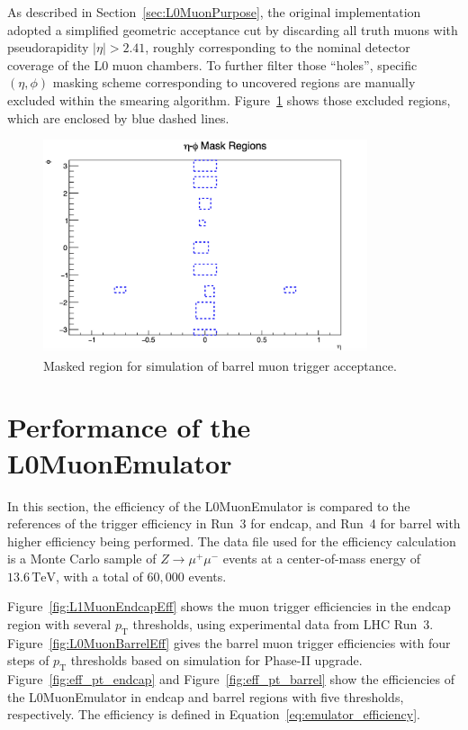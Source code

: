 As described in Section~\ref{sec:L0MuonPurpose}, the original implementation adopted a simplified geometric acceptance cut by discarding all truth muons with pseudorapidity $|\eta| > 2.41$, roughly corresponding to the nominal detector coverage of the L0 muon chambers. To further filter those ``holes'', specific $(\eta, \phi)$ masking scheme corresponding to uncovered regions are manually excluded within the smearing algorithm. Figure~\ref{fig:masking} shows those excluded regions, which are enclosed by blue dashed lines.

\begin{figure}[htbp]
  \centering
  \includegraphics[width=0.85\textwidth]{figs/chapter4/masked_eta_phi_map.png}
  \caption{Masked region for simulation of barrel muon trigger acceptance.}
  \label{fig:masking}
\end{figure}

\section{Performance of the L0MuonEmulator} \label{sec:L0MuonEmulatorPerformance}
In this section, the efficiency of the L0MuonEmulator is compared to the references of the trigger efficiency in Run~3 for endcap, and Run~4 for barrel with higher efficiency being performed. The data file used for the efficiency calculation is a Monte Carlo sample of $Z \to \mu^+ \mu^-$ events at a center-of-mass energy of $13.6\,\mathrm{TeV}$, with a total of $60{,}000$ events.

Figure~\ref{fig:L1MuonEndcapEff} shows the muon trigger efficiencies in the endcap region with several $p_\mathrm{T}$ thresholds, using experimental data from LHC Run~3. Figure~\ref{fig:L0MuonBarrelEff} gives the barrel muon trigger efficiencies with four steps of $p_\mathrm{T}$ thresholds based on simulation for Phase-II upgrade. Figure~\ref{fig:eff_pt_endcap} and Figure~\ref{fig:eff_pt_barrel} show the efficiencies of the L0MuonEmulator in endcap and barrel regions with five thresholds, respectively. The efficiency is defined in Equation~\ref{eq:emulator_efficiency}. 

